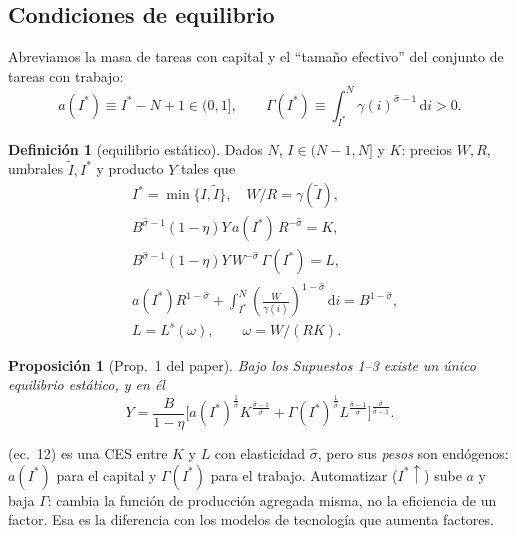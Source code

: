 \documentclass[11pt,a4paper]{article}
\theoremstyle{definition}
\newtheorem{definicion}{Definición}[section]
\theoremstyle{plain}
\newtheorem{proposicion}{Proposición}
\theoremstyle{remark}
\numberwithin{equation}{section}
\newcommand{\sh}{\hat\sigma}
\newcommand{\It}{\tilde I}
\newcommand{\Is}{I^{*}}
\newcommand{\dd}{\,\mathrm{d}}
\begin{document}
\subsection{Condiciones de equilibrio}
Abreviamos la masa de tareas con capital y el ``tamaño efectivo'' del conjunto de tareas con trabajo:
\begin{equation}\label{eq:aGamma}
  a(\Is)\equiv\Is-N+1\in(0,1],\qquad \Gamma(\Is)\equiv\int_{\Is}^{N}\gamma(i)^{\sh-1}\dd i>0 .
\end{equation}
\begin{definicion}[equilibrio estático]
Dados $N$, $I\in(N-1,N]$ y $K$: precios $W,R$, umbrales $\It,\Is$ y producto $Y$ tales que
\begin{align}
  &\Is=\min\{I,\It\},\quad W/R=\gamma(\It), \nonumber\\
  &B^{\sh-1}(1-\eta)Y\,a(\Is)\,R^{-\sh}=K, \tag{ec.~8}\\
  &B^{\sh-1}(1-\eta)Y\,W^{-\sh}\,\Gamma(\Is)=L, \tag{ec.~9}\\
  &a(\Is)R^{1-\sh}+\int_{\Is}^{N}\left(\frac{W}{\gamma(i)}\right)^{1-\sh}\dd i=B^{1-\sh}, \tag{ec.~10}\\
  &L=L^s(\omega),\qquad \omega=W/(RK). \tag{ec.~11}
\end{align}
\end{definicion}

\begin{proposicion}[Prop.~1 del paper]
Bajo los Supuestos 1–3 existe un único equilibrio estático, y en él
\begin{equation}\label{eq:Ycies}
  Y=\frac{B}{1-\eta}\Big[a(\Is)^{\frac1\sh}K^{\frac{\sh-1}{\sh}}+\Gamma(\Is)^{\frac1\sh}L^{\frac{\sh-1}{\sh}}\Big]^{\frac{\sh}{\sh-1}}. \tag{ec.~12}
\end{equation}
\end{proposicion}

\begin{intuicion}
(ec.~12) es una CES entre $K$ y $L$ con elasticidad $\sh$, pero sus \emph{pesos} son endógenos: $a(\Is)$ para el
capital y $\Gamma(\Is)$ para el trabajo. Automatizar ($\Is\uparrow$) sube $a$ y baja $\Gamma$: cambia la función de
producción agregada misma, no la eficiencia de un factor. Esa es la diferencia con los modelos de tecnología que
aumenta factores.
\end{intuicion}
\end{document}

